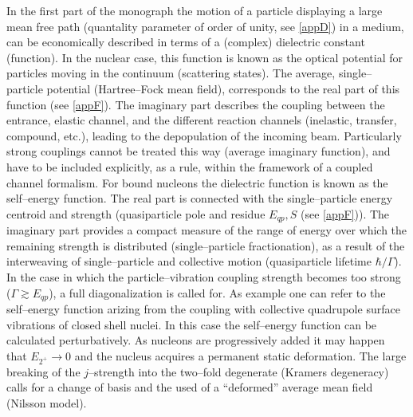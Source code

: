 In the first part of the monograph the motion of a particle displaying a large mean free path (quantality parameter of order of unity, see \ref{appD}) in a medium, can be economically described in terms of a (complex) dielectric constant (function). In the nuclear case, this function is known as the optical potential for particles moving in the continuum (scattering states). The average, single--particle potential (Hartree--Fock mean field), corresponds to the real part of this function (see \ref{appF}). The imaginary part describes the coupling between the entrance, elastic channel, and the different reaction channels (inelastic, transfer, compound, etc.), leading to the depopulation of the incoming beam. Particularly strong couplings cannot be treated this way (average imaginary function), and have to be included explicitly, as a rule, within the framework of a coupled channel formalism. For bound nucleons the dielectric function is known as the self--energy function. The real part is connected with the single--particle energy centroid and strength (quasiparticle pole and residue $E_{qp}, S$ (see \ref{appF})). The imaginary part provides a compact measure of the range of energy over which the remaining strength is distributed (single--particle fractionation), as a result of the interweaving of single--particle and collective motion (quasiparticle lifetime $\hbar/\Gamma$). In the case in which the particle--vibration coupling strength becomes too strong ($\Gamma\gtrsim E_{qp} $), a full diagonalization is called for. As example one can refer to the self--energy function arizing from the coupling with collective quadrupole surface vibrations of closed shell nuclei. In this case the self--energy function can be calculated perturbatively. As nucleons are progressively added it may happen that $E_{2^+}\rightarrow 0$ and the nucleus acquires a permanent static deformation. The large breaking of the $j$--strength into the two--fold degenerate (Kramers degeneracy) calls for a change of basis and the used of a ``deformed'' average mean field (Nilsson model).


